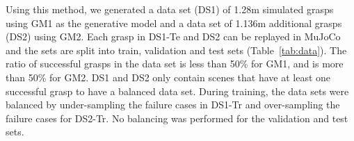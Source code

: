 Using this method, we generated a data set (DS1) of 1.28m simulated grasps using GM1 as the generative model and a data set of 1.136m additional grasps (DS2) using GM2. Each grasp in DS1-Te and DS2 can be replayed in MuJoCo and the sets are split into train, validation and test sets (Table~\ref{tab:data}). The ratio of successful grasps in the data set is less than 50\% for GM1, and is more than 50\% for GM2. DS1 and DS2 only contain scenes that have at least one successful grasp to have a balanced data set. During training, the data sets were balanced by under-sampling the failure cases in DS1-Tr and over-sampling the failure cases for DS2-Tr. No balancing was performed for the validation and test sets.
\begin{table}[t]
\centering
\caption{Statistics of the simulated data sets.}
\label{tab:data}
\end{table}

